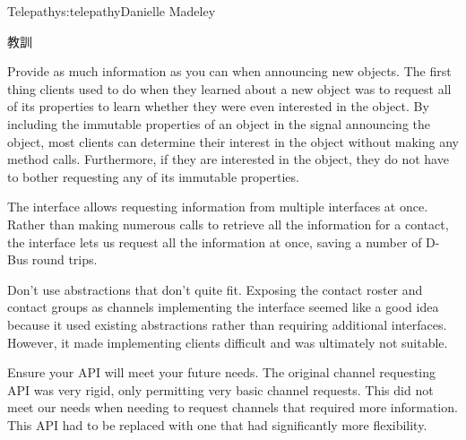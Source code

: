 \begin{aosachapter}{Telepathy}{s:telepathy}{Danielle Madeley}
\begin{aosasect1}{教訓}
\begin{aosadescription}
  \item{Provide as much information as you can when announcing new
    objects.}  The first thing clients used to do when they learned
    about a new object was to request all of its properties to learn
    whether they were even interested in the object. By including the
    immutable properties of an object in the signal announcing the
    object, most clients can determine their interest in the object
    without making any method calls. Furthermore, if they are
    interested in the object, they do not have to bother requesting
    any of its immutable properties.

  \item{The  interface allows requesting information
    from multiple interfaces at once.}  Rather than making numerous
     calls to retrieve all the information for a contact,
    the  interface lets us request all the information
    at once, saving a number of D-Bus round trips.

  \item{Don't use abstractions that don't quite fit.}  Exposing the
    contact roster and contact groups as channels implementing the
     interface seemed like a good idea because it used
    existing abstractions rather than requiring additional
    interfaces. However, it made implementing clients difficult and
    was ultimately not suitable.

  \item{Ensure your API will meet your future needs.}  The original
    channel requesting API was very rigid, only permitting very basic
    channel requests. This did not meet our needs when needing to
    request channels that required more information. This API had to
    be replaced with one that had significantly more flexibility.

\end{aosadescription}

\end{aosasect1}

\end{aosachapter}
